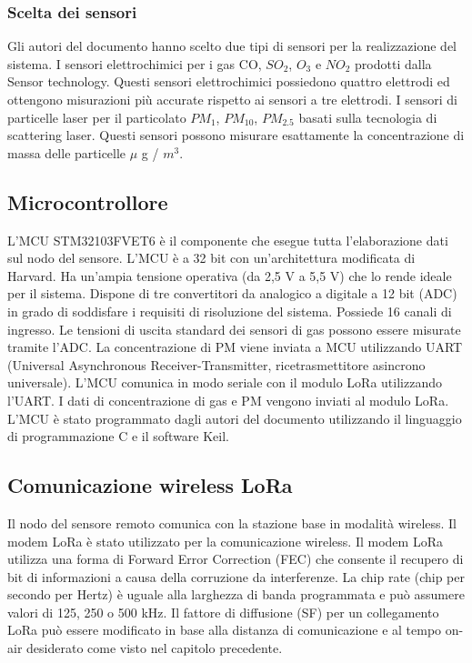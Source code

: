 \documentclass[a4paper]{report} %
\begin{document}
\subsubsection{Scelta dei sensori}
Gli autori del documento \cite{art:rif.40} hanno scelto due tipi di sensori per la realizzazione del sistema.
I sensori elettrochimici per i gas CO, $ SO_{2} $, $ O_{3} $ e $ NO_{2} $ prodotti dalla Sensor technology. 
Questi sensori elettrochimici possiedono quattro elettrodi ed ottengono misurazioni più accurate rispetto ai sensori a tre elettrodi.
I sensori di particelle laser per il particolato $ PM_{1} $, $ PM_{10} $, $ PM_{2.5} $ basati sulla tecnologia di scattering laser.
Questi sensori possono misurare esattamente la concentrazione di massa delle particelle $\mu$ g / $ m^3 $. 


\subsection{Microcontrollore}
L'MCU STM32103FVET6 è il componente che esegue tutta l'elaborazione dati sul nodo del sensore. 
L'MCU è a 32 bit con un'architettura modificata di Harvard. Ha un'ampia tensione operativa (da 2,5 V a 5,5 V) che lo rende ideale per il sistema. Dispone di tre convertitori da analogico a digitale a 12 bit (ADC) in grado di soddisfare i requisiti di risoluzione del sistema. Possiede 16 canali di ingresso. Le tensioni di uscita standard dei sensori di gas possono essere misurate tramite l'ADC. La concentrazione di PM viene inviata a MCU utilizzando UART (Universal Asynchronous Receiver-Transmitter, ricetrasmettitore asincrono universale). L'MCU comunica in modo seriale con il modulo LoRa utilizzando l'UART. I dati di concentrazione di gas e PM vengono inviati al modulo LoRa. L'MCU è stato programmato dagli autori del documento \cite{art:rif.40} utilizzando il linguaggio di programmazione C e il software Keil.

\subsection{Comunicazione wireless LoRa}
Il nodo del sensore remoto comunica con la stazione base in modalità wireless. Il modem LoRa è stato utilizzato per la comunicazione wireless. Il modem LoRa utilizza una forma di Forward Error Correction (FEC) che consente il recupero di bit di informazioni a causa della corruzione da interferenze. La chip rate (chip per secondo per Hertz) è uguale alla larghezza di banda programmata e può assumere valori di 125, 250 o 500 kHz. Il fattore di diffusione (SF) per un collegamento LoRa può essere modificato in base alla distanza di comunicazione e al tempo on-air desiderato come visto nel capitolo precedente.  
\end{document}
